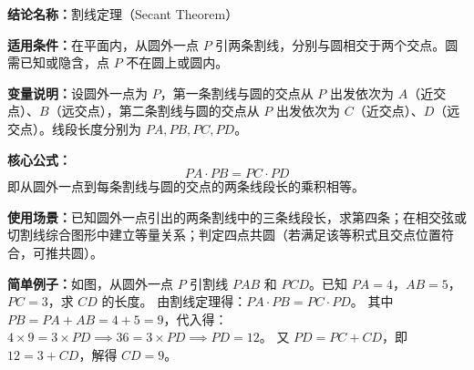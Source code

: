 \textbf{结论名称：}割线定理（Secant Theorem）

\textbf{适用条件：}在平面内，从圆外一点 \(P\) 引两条割线，分别与圆相交于两个交点。圆需已知或隐含，点 \(P\) 不在圆上或圆内。

\textbf{变量说明：}设圆外一点为 \(P\)，第一条割线与圆的交点从 \(P\) 出发依次为 \(A\)（近交点）、\(B\)（远交点），第二条割线与圆的交点从 \(P\) 出发依次为 \(C\)（近交点）、\(D\)（远交点）。线段长度分别为 \(PA, PB, PC, PD\)。

\textbf{核心公式：}
\[
\boxed{PA \cdot PB = PC \cdot PD}
\]
即从圆外一点到每条割线与圆的交点的两条线段长的乘积相等。

\textbf{使用场景：}已知圆外一点引出的两条割线中的三条线段长，求第四条；在相交弦或切割线综合图形中建立等量关系；判定四点共圆（若满足该等积式且交点位置符合，可推共圆）。

\textbf{简单例子：}如图，从圆外一点 \(P\) 引割线 \(PAB\) 和 \(PCD\)。已知 \(PA = 4\)，\(AB = 5\)，\(PC = 3\)，求 \(CD\) 的长度。
由割线定理得：\(PA \cdot PB = PC \cdot PD\)。
其中 \(PB = PA + AB = 4 + 5 = 9\)，代入得：
\(4 \times 9 = 3 \times PD \implies 36 = 3 \times PD \implies PD = 12\)。
又 \(PD = PC + CD\)，即 \(12 = 3 + CD\)，解得 \(CD = 9\)。